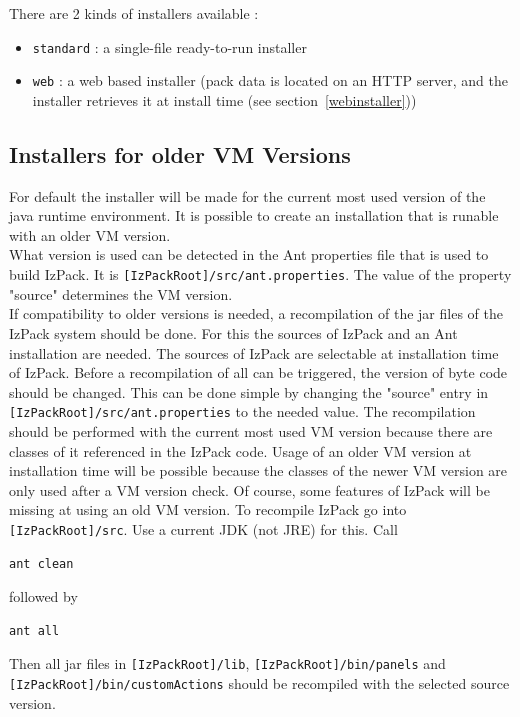There are 2 kinds of installers available :
\begin{itemize}
  \item \texttt{standard} : a single-file ready-to-run installer
  \item \texttt{web} : a web based installer (pack data is located on
  an HTTP server, and the installer retrieves it at install time (see
  section~\ref{webinstaller}))
\end{itemize}

\subsection{Installers for older VM Versions}
For default the installer will be made for the current most used version of
the java runtime environment. It is possible to create an installation that
is runable with an older VM version.\\
What version is used can be detected in the Ant properties file that is used 
to build IzPack. It is \texttt{[IzPackRoot]/src/ant.properties}. 
The value of the property "source" determines the VM version.\\
If compatibility to older versions is needed, a recompilation of the jar files 
of the IzPack system should be done. For this the sources of IzPack and an Ant
installation are needed. The sources of IzPack are selectable at installation
time of IzPack. Before a recompilation of all can be triggered, the version of 
byte code should be changed. This can be done simple by changing the "source" 
entry in \texttt{[IzPackRoot]/src/ant.properties} to the needed value. The 
recompilation should be performed with the current most used VM version 
because there are classes of it referenced in the IzPack code. Usage of an 
older VM version at installation time will be possible because the classes of
the newer VM version are only used after a VM version check. Of course, some 
features of IzPack will be missing at using an old VM version. To recompile
IzPack go into \texttt{[IzPackRoot]/src}. Use a current JDK (not JRE) for this. 
Call
\footnotesize
\begin{verbatim}
ant clean
\end{verbatim}
\normalsize
followed by
\footnotesize
\begin{verbatim}
ant all
\end{verbatim}
\normalsize
Then all jar files in \texttt{[IzPackRoot]/lib}, 
\texttt{[IzPackRoot]/bin/panels} and \texttt{[IzPackRoot]/bin/customActions}
should be recompiled with the selected source version.

